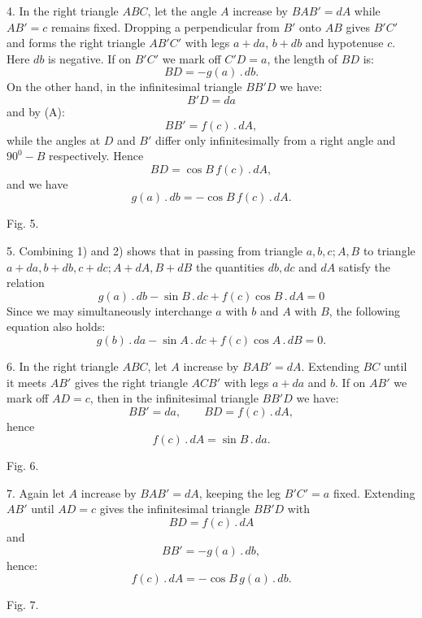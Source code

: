 %
4. In the right triangle $ABC$, let the angle $A$ increase by $BAB' = dA$
while $AB' = c$ remains fixed. Dropping a perpendicular from $B'$ onto $AB$
gives $B'C'$ and forms the right triangle $AB'C'$ with legs $a+da$, $b+db$ and
hypotenuse $c$. Here $db$ is negative. If on $B'C'$ we mark off $C'D = a$,
the length of $BD$ is:
\[
BD = -g(a) \,.\, db.
\]
On the other hand, in the infinitesimal triangle $BB'D$ we have:
\[
B'D = da
\]
and by (A):
\[
BB' = f(c) \,.\, dA,
\]
while the angles at $D$ and $B'$ differ only infinitesimally from a right
angle and $90^{0} - B$ respectively. Hence
\[
BD = \cos B\, f(c) \,.\, dA,
\]
and we have
\[
\tag*{2)} g(a) \,.\, db = -\cos B\, f(c) \,.\, dA.
\]

\begin{center}\begin{minipage}{\linewidth}\centering


Fig. 5.
\end{minipage}\end{center}

5. Combining 1) and 2) shows that in passing from triangle $a, b, c; A, B$ to triangle
$a+da, b+db, c+dc; A+dA, B+dB$ the quantities $db, dc$ and $dA$ satisfy the relation
\[
\tag*{I.} g(a) \,.\, db - \sin B \,.\, dc + f(c) \cos B \,.\, dA = 0
\]
Since we may simultaneously interchange $a$ with $b$ and $A$ with
$B$, the following equation also holds:
\[
\tag*{II.} g(b) \,.\, da - \sin A \,.\, dc + f(c) \cos A \,.\, dB = 0.
\]

6. In the right triangle $ABC$, let $A$ increase by $BAB' = dA$. Extending
$BC$ until it meets $AB'$ gives the right triangle $ACB'$ with legs $a+da$
and $b$. If on $AB'$ we mark off $AD = c$, then in the infinitesimal triangle
$BB'D$ we have:
\[
BB' = da, \qquad BD = f(c) \,.\, dA,
\]
hence
\[
\tag*{3)} f(c) \,.\, dA = \sin B \,.\, da.
\]

\begin{center}\begin{minipage}{\linewidth}\centering


Fig. 6.
\end{minipage}\end{center}

7. Again let $A$ increase by $BAB' = dA$, keeping the leg $B'C' = a$ fixed.
Extending $AB'$ until $AD = c$ gives the infinitesimal triangle $BB'D$ with
\[
BD = f(c) \,.\, dA
\]
and
\[
BB' = -g(a) \,.\, db,
\]
hence:
\[
\tag*{4)} f(c) \,.\, dA = -\cos B\, g(a) \,.\, db.
\]

\begin{center}\begin{minipage}{\linewidth}\centering


Fig. 7.
\end{minipage}\end{center}
